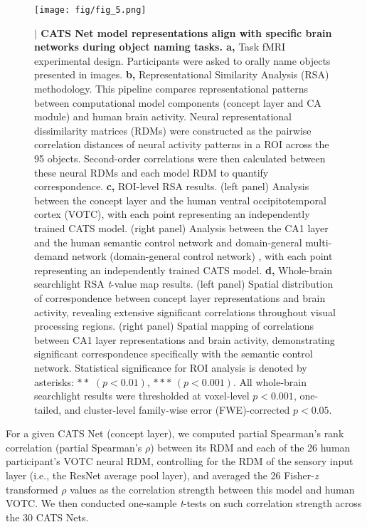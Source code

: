 \documentclass[pdflatex,sn-mathphys-num,lineno]{sn-jnl}%
\begin{document}
\begin{CJK}{UTF8}{gbsn}
\begin{figure}[htbp]
\centering
\texttt{[image: fig/fig\_5.png]}
\caption{\textbf{$\vert$ CATS Net model representations align with specific brain networks during object naming tasks. a,} Task fMRI experimental design. Participants were asked to orally name objects presented in images. \textbf{b,} Representational Similarity Analysis (RSA) methodology. This pipeline compares representational patterns between computational model components (concept layer and CA module) and human brain activity. Neural representational dissimilarity matrices (RDMs) were constructed as the pairwise correlation distances of neural activity patterns in a ROI across the 95 objects. Second-order correlations were then calculated between these neural RDMs and each model RDM to quantify correspondence. \textbf{c,} ROI-level RSA results. (left panel) Analysis between the concept layer and the human ventral occipitotemporal cortex (VOTC), with each point representing an independently trained CATS model. (right panel) Analysis between the CA1 layer and the human semantic control network \cite{jackson_neural_2021} and domain-general multi-demand network (domain-general control network) \cite{fedorenko_broad_2013}, with each point representing an independently trained CATS model. \textbf{d,} Whole-brain searchlight RSA \textit{t}-value map results. (left panel) Spatial distribution of correspondence between concept layer representations and brain activity, revealing extensive significant correlations throughout visual processing regions. (right panel) Spatial mapping of correlations between CA1 layer representations and brain activity, demonstrating significant correspondence specifically with the semantic control network. Statistical significance for ROI analysis is denoted by asterisks: $**$ $(p < 0.01)$, $***$ $(p < 0.001)$. All whole-brain searchlight results were thresholded at voxel-level $p < 0.001$, one-tailed, and cluster-level family-wise error (FWE)-corrected $p < 0.05$.}
\label{fig5}
\end{figure}

For a given CATS Net (concept layer), we computed partial Spearman’s rank correlation (partial Spearman’s $\rho$) between its RDM and each of the 26 human participant’s VOTC neural RDM, controlling for the RDM of the sensory input layer (i.e., the ResNet average pool layer), and averaged the 26 Fisher-\textit{z} transformed $\rho$ values as the correlation strength between this model and human VOTC. We then conducted one-sample \textit{t}-tests on such correlation strength across the 30 CATS Nets.


\end{CJK}
\end{document}
